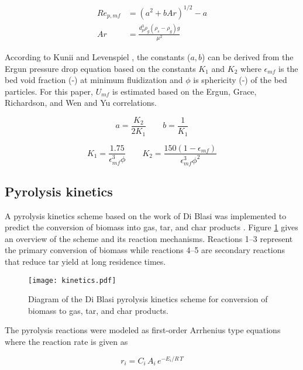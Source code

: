 \begin{align}
    Re_{p,mf} &= \left( a^2 + b Ar \right)^{1/2} - a \\
    Ar &= \frac{d_p^3 \rho_g (\rho_s - \rho_g) g}{\mu^2}
\end{align}

According to Kunii and Levenspiel \cite{Levenspiel-1991}, the constants ($a, b$) can be derived from the Ergun pressure drop equation based on the constants $K_1$ and $K_2$ where $\epsilon_{mf}$ is the bed void fraction (-) at minimum fluidization and $\phi$ is sphericity (-) of the bed particles. For this paper, $U_{mf}$ is estimated based on the Ergun, Grace, Richardson, and Wen and Yu correlations.

\begin{equation}
    a = \frac{K_2}{2 K_1} \qquad
    b = \frac{1}{K_1}
\end{equation}

\begin{equation}
    K_1 = \frac{1.75}{\epsilon_{mf}^3 \phi} \qquad
    K_2 = \frac{150(1-\epsilon_{mf})}{\epsilon_{mf}^3 \phi^2}
\end{equation}

\subsection{Pyrolysis kinetics}

A pyrolysis kinetics scheme based on the work of Di Blasi was implemented to predict the conversion of biomass into gas, tar, and char products \cite{Blasi-1993,Blasi-2001}. Figure \ref{fig:blasi} gives an overview of the scheme and its reaction mechanisms. Reactions 1--3 represent the primary conversion of biomass while reactions 4--5 are secondary reactions that reduce tar yield at long residence times.

\begin{figure}[H]
    \centering
    \texttt{[image: kinetics.pdf]}
    \caption{Diagram of the Di Blasi pyrolysis kinetics scheme for conversion of biomass to gas, tar, and char products.}
    \label{fig:blasi}
\end{figure}

The pyrolysis reactions were modeled as first-order Arrhenius type equations where the reaction rate is given as

\begin{equation}
    r_i = C_i\,A_i\,e^{-E_i / R\,T}
\end{equation}

